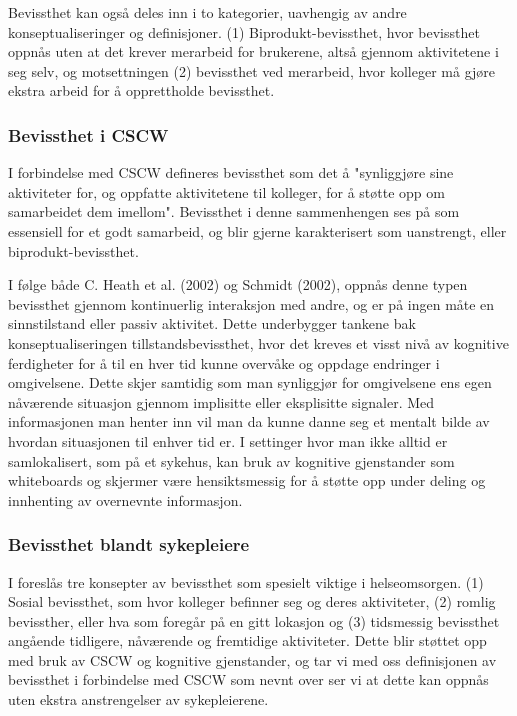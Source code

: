 \noindent
Bevissthet kan også deles inn i to kategorier, uavhengig av andre konseptualiseringer og definisjoner. (1) Biprodukt-bevissthet, hvor bevissthet oppnås uten at det krever merarbeid for brukerene, altså gjennom aktivitetene i seg selv, og motsettningen (2) bevissthet ved merarbeid, hvor kolleger må gjøre ekstra arbeid for å opprettholde bevissthet\cite{Randell}. 


\subsubsection{Bevissthet i CSCW}
I forbindelse med CSCW defineres bevissthet som det å "synliggjøre sine aktiviteter for, og oppfatte aktivitetene til kolleger, for å støtte opp om samarbeidet dem imellom". Bevissthet i denne sammenhengen ses på som essensiell for et godt samarbeid, og blir gjerne karakterisert som uanstrengt, eller biprodukt-bevissthet\cite{Randell}. 

\noindent
I følge både C. Heath et al. (2002) og Schmidt (2002), oppnås denne typen bevissthet gjennom kontinuerlig interaksjon med andre, og er på ingen måte en sinnstilstand eller passiv aktivitet. Dette underbygger tankene bak konseptualiseringen tillstandsbevissthet, hvor det kreves et visst nivå av kognitive ferdigheter for å til en hver tid kunne overvåke og oppdage endringer i omgivelsene. Dette skjer samtidig som man synliggjør for omgivelsene ens egen nåværende situasjon gjennom implisitte eller eksplisitte signaler. Med informasjonen man henter inn vil man da kunne danne seg et mentalt bilde av hvordan situasjonen til enhver tid er. I settinger hvor man ikke alltid er samlokalisert, som på et sykehus, kan bruk av kognitive gjenstander som whiteboards og skjermer være hensiktsmessig for å støtte opp under deling og innhenting av overnevnte informasjon\cite{Bardram04}. 

\subsubsection{Bevissthet blandt sykepleiere}
I \cite{Randell} foreslås tre konsepter av bevissthet som spesielt viktige i helseomsorgen. (1) Sosial bevissthet, som hvor kolleger befinner seg og deres aktiviteter, (2) romlig bevissther, eller hva som foregår på en gitt lokasjon og (3) tidsmessig bevissthet angående tidligere, nåværende og fremtidige aktiviteter. Dette blir støttet opp med bruk av CSCW og kognitive gjenstander, og tar vi med oss definisjonen av bevissthet i forbindelse med CSCW som nevnt over ser vi at dette kan oppnås uten ekstra anstrengelser av sykepleierene.


